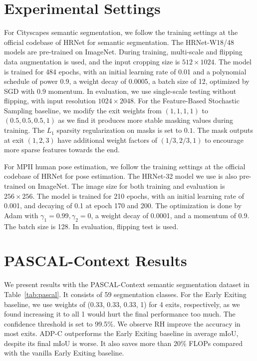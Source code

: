 \section{Experimental Settings}
\label{app:train}
For Cityscapes semantic segmentation, we follow the training settings at the official codebase \cite{hrnet_ss_github} of HRNet for semantic segmentation. The HRNet-W18/48 models are pre-trained on ImageNet. During training, multi-scale and flipping data augmentation is used, and the input cropping size is $512\times 1024$. The model is trained for 484 epochs, with an initial learning rate of 0.01 and a polynomial schedule of power 0.9, a weight decay of 0.0005, a batch size of 12, optimized by SGD with 0.9 momentum. In evaluation, we use single-scale testing without flipping, with input resolution $1024\times 2048$. For the Feature-Based Stochastic Sampling baseline, we modify the exit weights from $(1, 1, 1, 1)$ to $(0.5, 0.5, 0.5, 1)$ as we find it produces more stable masking values during training. The $L_1$ sparsity regularization on masks is set to $0.1$. The mask outputs at exit $(1,2,3)$ have additional weight factors of $(1/3, 2/3, 1)$ to encourage more sparse features towards the end.

For MPII human pose estimation, we follow the training settings at the official codebase \cite{hrnet_hpe_github} of HRNet for pose estimation. The HRNet-32 model we use is also pre-trained on ImageNet. The image size for both training and evaluation is $256\times 256$. The model is trained for 210 epochs, with an initial learning rate of 0.001, and decaying of 0.1 at epoch 170 and 200. The optimization is done by Adam with $\gamma_1=0.99, \gamma_2=0$, a weight decay of 0.0001, and a momentum of 0.9. The batch size is 128. In evaluation, flipping test is used.

\section{PASCAL-Context Results}
We present results with the PASCAL-Context semantic segmentation dataset \cite{mottaghi_cvpr14} in Table~\ref{tab:pascal}. It consists of 59 segmentation classes.
For the Early Exiting baseline, we use weights of (0.33, 0.33, 0.33, 1) for 4 exits, respectively, as we found increasing it to all 1 would hurt the final performance too much. 
The confidence threshold is set to 99.5\%. We observe RH improve the accuracy in most exits. ADP-C outperforms the Early Exiting baseline in average mIoU, despite its final mIoU is worse. It also saves more than 20\% FLOPs compared with the vanilla Early Exiting baseline.

